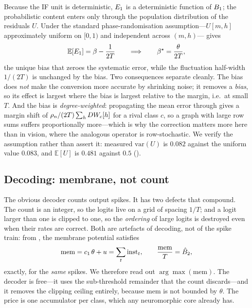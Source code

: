 Because the IF unit is deterministic, $E_{1}$ is a deterministic function of $B_{1}$; the
probabilistic content enters only through the population distribution of the residuals $U$. Under the
standard phase-randomisation assumption---$U[m,h]$ approximately uniform on $[0,1)$ and independent
across $(m,h)$--- gives
\begin{equation}
\mathbb{E}[E_{1}] = \beta - \frac{1}{2T}
\qquad\Longrightarrow\qquad
\beta^{\star} = \frac{\theta}{2T},
\label{eq:betastar}
\end{equation}
the unique bias that zeroes the systematic error, while the fluctuation half-width $1/(2T)$ is
unchanged by the bias. Two consequences separate cleanly. The bias does \emph{not} make the
conversion more accurate by shrinking noise; it removes a \emph{bias}, so its effect is largest where
the bias is largest relative to the margin, i.e.\ at small $T$. And the bias is
\emph{degree-weighted}: propagating the mean error through  gives a margin shift
of $\rho_{n}/(2T)\sum_{h} DW_{c}[h]$ for a rival class $c$, so a graph with large row sums suffers
proportionally more---which is why the correction matters more here than in vision, where the
analogous operator is row-stochastic. We verify the assumption rather than assert it: measured
$\mathrm{var}(U)$ is $0.082$ against the uniform value $0.083$, and $\mathbb{E}[U]$ is $0.481$
against $0.5$ ().

\subsection{Decoding: membrane, not count}
\label{sec:readout}

The obvious decoder counts output spikes. It has two defects that compound. The count is an integer,
so the logits live on a grid of spacing $1/T$; and a logit larger than one is clipped to one, so the
\emph{ordering} of large logits is destroyed even when their rates are correct. Both are artefacts of
decoding, not of the spike train: from , the membrane potential satisfies
\begin{equation}
\mathrm{mem} = c_{1}\,\theta + u = \sum_{t} \mathrm{inst}_{t},
\qquad \frac{\mathrm{mem}}{T} = \hat{B}_{2},
\label{eq:memreadout}
\end{equation}
exactly, for the \emph{same} spikes. We therefore read out $\arg\max(\mathrm{mem})$. The decoder is
free---it uses the sub-threshold remainder that the count discards---and it removes the clipping
ceiling entirely, because $\mathrm{mem}$ is not bounded by $\theta$. The price is one accumulator per
class, which any neuromorphic core already has.

